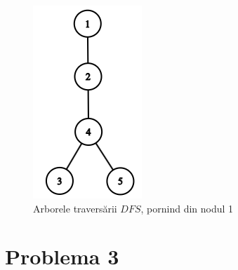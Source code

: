 \documentclass{article}
\begin{document}
\begin{figure}[h]
\begin{minipage}{0.45\textwidth}
        \includegraphics[width=\textwidth]{images/DFS_tree_cropped.png}
        \caption{Arborele traversării $DFS$, pornind din nodul 1}
        \label{fig:arbore}
    \end{minipage}
\end{figure}

\section*{\fontsize{20}{50}\selectfont Problema 3}
\end{document}
